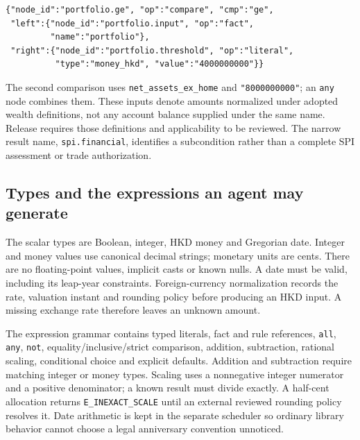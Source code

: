 \documentclass[12pt,a4paper,oneside,openany]{book}
\begin{document}
\begin{minipage}{\textwidth}
\begin{lstlisting}[caption={The portfolio comparison in the supplied JSON bundle. Amounts are HK cents.}]
{"node_id":"portfolio.ge", "op":"compare", "cmp":"ge",
 "left":{"node_id":"portfolio.input", "op":"fact",
         "name":"portfolio"},
 "right":{"node_id":"portfolio.threshold", "op":"literal",
          "type":"money_hkd", "value":"4000000000"}}
\end{lstlisting}
\end{minipage}

The second comparison uses \texttt{net\_assets\_ex\_home} and
\texttt{"8000000000"}; an \texttt{any} node combines them. These inputs denote
amounts normalized under adopted wealth definitions, not any account balance
supplied under the same name. Release requires those definitions and applicability
to be reviewed. The narrow result name, \texttt{spi.financial}, identifies a
subcondition rather than a complete SPI assessment or trade authorization.

\subsection{Types and the expressions an agent may generate}
\label{merge:P-03a-rule-contract:00}


The scalar types are Boolean, integer, HKD money and Gregorian date. Integer
and money values use canonical decimal strings; monetary units are cents.
There are no floating-point values, implicit casts or known nulls. A date must
be valid, including its leap-year constraints. Foreign-currency normalization
records the rate, valuation instant and rounding policy before producing an HKD
input. A missing exchange rate therefore leaves an unknown amount.

The expression grammar contains typed literals, fact and rule references,
\texttt{all}, \texttt{any}, \texttt{not}, equality/inclusive/strict comparison,
addition, subtraction, rational scaling, conditional choice and explicit defaults.
Addition and subtraction require matching integer or money types. Scaling uses
a nonnegative integer numerator and a positive denominator; a known result must
divide exactly. A half-cent allocation returns \texttt{E\_INEXACT\_SCALE} until
an external reviewed rounding policy resolves it. Date arithmetic is kept in
the separate scheduler so ordinary library behavior cannot choose a legal
anniversary convention unnoticed.
\end{document}
